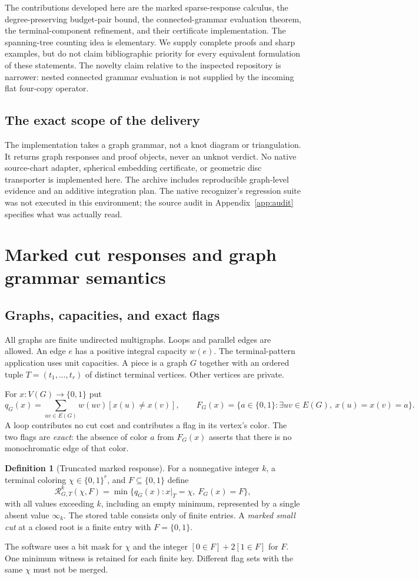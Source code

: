 \documentclass[11pt,a4paper]{article}
\theoremstyle{definition}
\newtheorem{definition}[theorem]{Definition}
\theoremstyle{remark}
\newcommand{\Resp}{\mathcal R}
\begin{document}
The contributions developed here are the marked sparse-response calculus, the degree-preserving budget-pair bound, the connected-grammar evaluation theorem, the terminal-component refinement, and their certificate implementation. The spanning-tree counting idea is elementary. We supply complete proofs and sharp examples, but do not claim bibliographic priority for every equivalent formulation of these statements. The novelty claim relative to the inspected repository is narrower: nested connected grammar evaluation is not supplied by the incoming flat four-copy operator.

\subsection{The exact scope of the delivery}
The implementation takes a graph grammar, not a knot diagram or triangulation. It returns graph responses and proof objects, never an unknot verdict. No native source-chart adapter, spherical embedding certificate, or geometric disc transporter is implemented here. The archive includes reproducible graph-level evidence and an additive integration plan. The native recognizer's regression suite was not executed in this environment; the source audit in Appendix~\ref{app:audit} specifies what was actually read.

\section{Marked cut responses and graph grammar semantics}
\label{sec:model}
\subsection{Graphs, capacities, and exact flags}
All graphs are finite undirected multigraphs. Loops and parallel edges are allowed. An edge $e$ has a positive integral capacity $w(e)$. The terminal-pattern application uses unit capacities. A piece is a graph $G$ together with an ordered tuple $T=(t_1,\ldots,t_r)$ of distinct terminal vertices. Other vertices are private.

For $x:V(G)\to\{0,1\}$ put
\[
 q_G(x)=\sum_{uv\in E(G)}w(uv)[x(u)\ne x(v)],\qquad
 F_G(x)=\{a\in\{0,1\}:\exists uv\in E(G),\ x(u)=x(v)=a\}.
\]
A loop contributes no cut cost and contributes a flag in its vertex's color. The two flags are \emph{exact}: the absence of color $a$ from $F_G(x)$ asserts that there is no monochromatic edge of that color.

\begin{definition}[Truncated marked response]
For a nonnegative integer $k$, a terminal coloring $\chi\in\{0,1\}^r$, and $F\subseteq\{0,1\}$ define
\[
 \Resp_{G,T}^{k}(\chi,F)=
 \min\{q_G(x):x|_T=\chi,\ F_G(x)=F\},
\]
with all values exceeding $k$, including an empty minimum, represented by a single absent value $\infty_k$. The stored table consists only of finite entries. A \emph{marked small cut} at a closed root is a finite entry with $F=\{0,1\}$.
\end{definition}
The software uses a bit mask for $\chi$ and the integer $[0\in F]+2[1\in F]$ for $F$. One minimum witness is retained for each finite key. Different flag sets with the same $\chi$ must not be merged.
\end{document}

